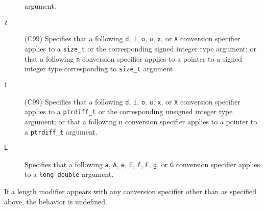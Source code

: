 \begin{description}
argument.
	\item[\texttt{z}] (C99) Specifies that a following \texttt{d}, \texttt{i},
\texttt{o}, \texttt{u}, \texttt{x}, or \texttt{X} conversion specifier applies
to a \texttt{size\_t} or the corresponding signed integer type argument; or
that a following \texttt{n} conversion specifier applies to a pointer to a
signed integer type corresponding to \texttt{size\_t} argument.
	\item[\texttt{t}] (C99) Specifies that a following \texttt{d}, \texttt{i},
\texttt{o}, \texttt{u}, \texttt{x}, or \texttt{X} conversion specifier applies
to a \texttt{ptrdiff\_t} or the corresponding unsigned integer type argument;
or that a following \texttt{n} conversion specifier applies to a pointer to a
\texttt{ptrdiff\_t} argument.
	\item[\texttt{L}] Specifies that a following \texttt{a}, \texttt{A},
\texttt{e}, \texttt{E}, \texttt{f}, \texttt{F}, \texttt{g}, or \texttt{G}
conversion specifier applies to a \texttt{long double} argument.
\end{description}

If a length modifier appears with any conversion specifier other than as
specified above, the behavior is undefined.

